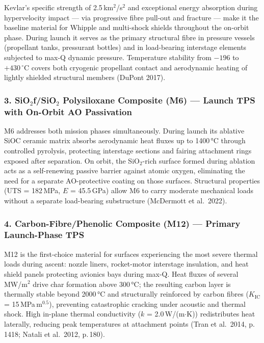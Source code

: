 \documentclass[11pt,a4paper]{article}
\begin{document}
Kevlar's specific strength of 2.5\,km$^{2}$/s$^{2}$ and exceptional energy
absorption during hypervelocity impact — via progressive fibre pull-out and
fracture — make it the baseline material for Whipple and multi-shock shields
throughout the on-orbit phase. During launch it serves as the primary structural
fibre in pressure vessels (propellant tanks, pressurant bottles) and in
load-bearing interstage elements subjected to max-Q dynamic pressure. Temperature
stability from $-196$ to $+430\,^{\circ}$C covers both cryogenic propellant
contact and aerodynamic heating of lightly shielded structural members (DuPont 2017).

\subsubsection*{3. SiO$_{2}$f/SiO$_{2}$ Polysiloxane Composite (M6) — Launch TPS with On-Orbit AO Passivation}

M6 addresses both mission phases simultaneously. During launch its ablative
SiOC ceramic matrix absorbs aerodynamic heat fluxes up to 1400\,°C through
controlled pyrolysis, protecting interstage sections and fairing attachment
rings exposed after separation. On orbit, the SiO$_{2}$-rich surface formed
during ablation acts as a self-renewing passive barrier against atomic oxygen,
eliminating the need for a separate AO-protective coating on those surfaces.
Structural properties (UTS = 182\,MPa, $E$ = 45.5\,GPa) allow M6 to carry
moderate mechanical loads without a separate load-bearing substructure
(McDermott et al.\ 2022).

\subsubsection*{4. Carbon-Fibre/Phenolic Composite (M12) — Primary Launch-Phase TPS}

M12 is the first-choice material for surfaces experiencing the most severe
thermal loads during ascent: nozzle liners, rocket-motor interstage insulation,
and heat shield panels protecting avionics bays during max-Q. Heat fluxes of
several MW/m$^{2}$ drive char formation above 300\,°C; the resulting carbon
layer is thermally stable beyond 2000\,°C and structurally reinforced by carbon
fibres ($K_{\mathrm{IC}}$ = 15\,MPa$\,\mathrm{m}^{0.5}$), preventing
catastrophic cracking under acoustic and thermal shock. High in-plane thermal
conductivity ($k$ = 2.0\,W/(m$\cdot$K)) redistributes heat laterally, reducing
peak temperatures at attachment points (Tran et al.\ 2014, p.\,1418; Natali
et al.\ 2012, p.\,180).
\end{document}
